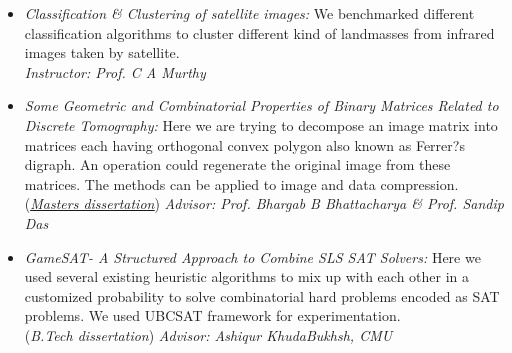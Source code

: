 \documentclass{res}
\begin{document}
\begin{resume}
\begin{itemize}
 \item {{\it Classification \& Clustering of satellite images:}} We benchmarked different classification algorithms to cluster different 
 kind of landmasses from infrared images taken by satellite. \\
 {\it Instructor: Prof. C A Murthy}
  
 \item {{\it Some Geometric and Combinatorial Properties of Binary Matrices Related to
Discrete Tomography:}} Here we are trying to decompose an image matrix into matrices
each having orthogonal convex polygon also known as Ferrer?s digraph. An operation could
regenerate the original image from these matrices. The methods can be applied to image and
data compression. (\href{https://drive.google.com/open?id=0B3ErYrn4jOcxSHhReVF6cmROelE}{\it  \underline{Masters dissertation}}) 
{\it Advisor: Prof. Bhargab B Bhattacharya \& Prof. Sandip Das}

 \item 
 {{\it GameSAT- A Structured Approach to Combine SLS SAT Solvers:}} Here we used several existing heuristic algorithms to mix up with each other in a customized probability to solve combinatorial hard problems encoded as SAT problems. We used UBCSAT framework for experimentation. \\
({\it B.Tech dissertation}) {\it Advisor: Ashiqur KhudaBukhsh, CMU}

%
% 
 
 \end{itemize}



 
            


\end{resume}
\end{document}
